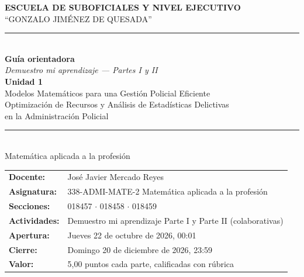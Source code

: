 



\begin{titlepage}
\centering
\vspace*{1.2cm}

\begin{tcolorbox}[colback=policiaAzul, colframe=policiaDorado, boxrule=2pt, arc=4mm, left=20pt, right=20pt, top=20pt, bottom=20pt]
\color{white}
{\footnotesize\textbf{ESCUELA DE SUBOFICIALES Y NIVEL EJECUTIVO}}\\[2pt]
{\footnotesize ``GONZALO JIMÉNEZ DE QUESADA''}\\[10pt]
\color{policiaDorado}\rule{0.4\textwidth}{0.6pt}\\[10pt]
\color{white}
{\LARGE\textbf{Guía orientadora}}\\[6pt]
{\Large \textit{Demuestro mi aprendizaje --- Partes I y II}}\\[10pt]
\color{policiaDorado}
{\large\textbf{Unidad 1}}\\[3pt]
\color{white}
{\large Modelos Matemáticos para una Gestión Policial Eficiente}\\[6pt]
{\normalsize Optimización de Recursos y Análisis de Estadísticas Delictivas}\\
{\normalsize en la Administración Policial}\\[14pt]
\color{policiaDorado}\rule{0.4\textwidth}{0.6pt}\\[10pt]
\color{white}
{\normalsize Matemática aplicada a la profesión}
\end{tcolorbox}

\vspace{1cm}

\begin{tabular}{@{}p{}p{}@{}}
\textbf{\color{policiaAzul}Docente:} & José Javier Mercado Reyes\\[5pt]
\textbf{\color{policiaAzul}Asignatura:} & 338-ADMI-MATE-2 Matemática aplicada a la profesión\\[5pt]
\textbf{\color{policiaAzul}Secciones:} & 018457 $\cdot$ 018458 $\cdot$ 018459\\[5pt]
\textbf{\color{policiaAzul}Actividades:} & Demuestro mi aprendizaje Parte I y Parte II (colaborativas)\\[5pt]
\textbf{\color{policiaAzul}Apertura:} & Jueves 22 de octubre de 2026, 00:01\\[5pt]
\textbf{\color{policiaAzul}Cierre:} & Domingo 20 de diciembre de 2026, 23:59\\[5pt]
\textbf{\color{policiaAzul}Valor:} & 5,00 puntos cada parte, calificadas con rúbrica
\end{tabular}


\end{titlepage}

